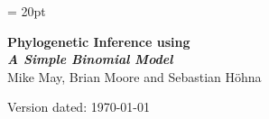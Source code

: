 \documentclass[11pt]{article}
\begin{document}
\renewcommand{\headrulewidth}{0.5pt}
\headsep = 20pt
\lhead{ }

\thispagestyle{plain}
\begin{center}

\textbf{\LARGE Phylogenetic Inference using \RevBayes}\\\vspace{2mm}
\textbf{\it{\Large A Simple Binomial Model}}\\\vspace{2mm}
\vspace{1cm}
{\Large Mike May, Brian Moore and Sebastian H{\"o}hna}
\vspace{1cm}
\end{center}

\def \ResourcePath {./}
\def \GlobalResourcePath {../}


Version dated: \today
\end{document}
